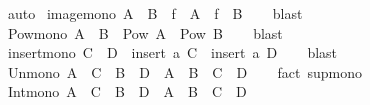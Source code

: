 \begin{isabellebody}
\isamarkupfalse%
\ auto%
\endisatagproof
{\isafoldproof}%
%
\isadelimproof
%
\endisadelimproof
%
\isadelimdocument
%
\endisadelimdocument
%
\isatagdocument
%
\isamarkuptrue%
%
\endisatagdocument
{\isafolddocument}%
%
\isadelimdocument
%
\endisadelimdocument
{}\isamarkupfalse%
\ image{\isacharunderscore}{\kern0pt}mono{\isacharcolon}{\kern0pt}\ {\isachardoublequoteopen}A\ {\isasymsubseteq}\ B\ {\isasymLongrightarrow}\ f\ {\isacharbackquote}{\kern0pt}\ A\ {\isasymsubseteq}\ f\ {\isacharbackquote}{\kern0pt}\ B{\isachardoublequoteclose}\isanewline
%
\isadelimproof
\ \ %
\endisadelimproof
%
\isatagproof
{}\isamarkupfalse%
\ blast%
\endisatagproof
{\isafoldproof}%
%
\isadelimproof
\isanewline
%
\endisadelimproof
\isanewline
{}\isamarkupfalse%
\ Pow{\isacharunderscore}{\kern0pt}mono{\isacharcolon}{\kern0pt}\ {\isachardoublequoteopen}A\ {\isasymsubseteq}\ B\ {\isasymLongrightarrow}\ Pow\ A\ {\isasymsubseteq}\ Pow\ B{\isachardoublequoteclose}\isanewline
%
\isadelimproof
\ \ %
\endisadelimproof
%
\isatagproof
{}\isamarkupfalse%
\ blast%
\endisatagproof
{\isafoldproof}%
%
\isadelimproof
\isanewline
%
\endisadelimproof
\isanewline
{}\isamarkupfalse%
\ insert{\isacharunderscore}{\kern0pt}mono{\isacharcolon}{\kern0pt}\ {\isachardoublequoteopen}C\ {\isasymsubseteq}\ D\ {\isasymLongrightarrow}\ insert\ a\ C\ {\isasymsubseteq}\ insert\ a\ D{\isachardoublequoteclose}\isanewline
%
\isadelimproof
\ \ %
\endisadelimproof
%
\isatagproof
{}\isamarkupfalse%
\ blast%
\endisatagproof
{\isafoldproof}%
%
\isadelimproof
\isanewline
%
\endisadelimproof
\isanewline
{}\isamarkupfalse%
\ Un{\isacharunderscore}{\kern0pt}mono{\isacharcolon}{\kern0pt}\ {\isachardoublequoteopen}A\ {\isasymsubseteq}\ C\ {\isasymLongrightarrow}\ B\ {\isasymsubseteq}\ D\ {\isasymLongrightarrow}\ A\ {\isasymunion}\ B\ {\isasymsubseteq}\ C\ {\isasymunion}\ D{\isachardoublequoteclose}\isanewline
%
\isadelimproof
\ \ %
\endisadelimproof
%
\isatagproof
{}\isamarkupfalse%
\ {\isacharparenleft}{\kern0pt}fact\ sup{\isacharunderscore}{\kern0pt}mono{\isacharparenright}{\kern0pt}%
\endisatagproof
{\isafoldproof}%
%
\isadelimproof
\isanewline
%
\endisadelimproof
\isanewline
{}\isamarkupfalse%
\ Int{\isacharunderscore}{\kern0pt}mono{\isacharcolon}{\kern0pt}\ {\isachardoublequoteopen}A\ {\isasymsubseteq}\ C\ {\isasymLongrightarrow}\ B\ {\isasymsubseteq}\ D\ {\isasymLongrightarrow}\ A\ {\isasyminter}\ B\ {\isasymsubseteq}\ C\ {\isasyminter}\ D{\isachardoublequoteclose}\isanewline

\end{isabellebody}
